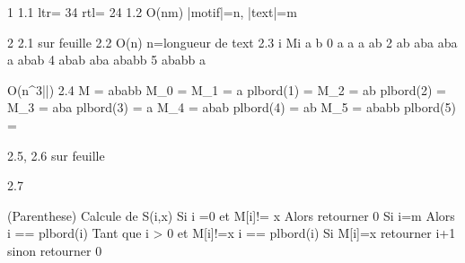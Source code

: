 1
1.1	
	ltr= 34
	rtl= 24
1.2 
	O(nm) |motif|=n, |text|=m

2
2.1
	sur feuille
2.2
	O(n) n=longueur de text
2.3 
	i	Mi 			a 		b
	0	\varepsilon	a 		 	a 			a 		ab
	2 	ab 			aba 	 	aba 		a 		abab
	4 	abab 		aba 	ababb
	5 	ababb 		a 		\varepsilon

	O(n^3|\sigma|)
2.4
	M = ababb
	M_0 = \varepsilon
	M_1 = a  		plbord(1) = \varepsilon
	M_2 = ab 		plbord(2) = \varepsilon
	M_3 = aba 		plbord(3) = a
	M_4 = abab 		plbord(4) = ab
	M_5 = ababb 	plbord(5) = \varepsilon

2.5, 2.6
	sur feuille

2.7
	



(Parenthese)
Calcule de S(i,x)
Si i =0 et M[i]!= x Alors
	retourner 0
Si i=m Alors
	i == plbord(i)
Tant que i > 0 et M[i]!=x
	i == plbord(i)
Si M[i]=x
	retourner i+1
sinon retourner 0
